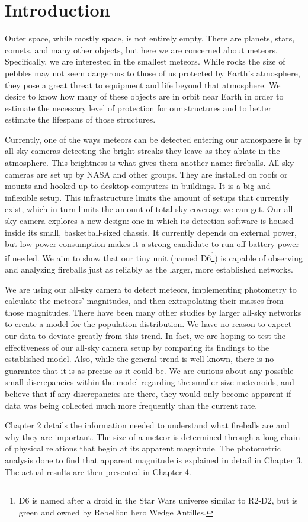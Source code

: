 \chapter{Introduction}

Outer space, while mostly space, is not entirely empty.  There are planets, stars, comets, and many other objects, but here we are concerned about meteors. Specifically, we are interested in the smallest meteors. While rocks the size of pebbles may not seem dangerous to those of us protected by Earth's atmosphere, they pose a great threat to equipment and life beyond that atmosphere. We desire to know how many of these objects are in orbit near Earth in order to estimate the necessary level of protection for our structures and to better estimate the lifespans of those structures.

Currently, one of the ways meteors can be detected entering our atmosphere is by all-sky cameras detecting the bright streaks they leave as they ablate in the atmosphere. This brightness is what gives them another name: fireballs. All-sky cameras are set up by NASA and other groups\cite{Jenniskens2011,Trigo-Rodriguez2007}. They are installed on roofs or mounts and hooked up to desktop computers in buildings. It is a big and inflexible setup. This infrastructure limits the amount of setups that currently exist, which in turn limits the amount of total sky coverage we can get. Our all-sky camera explores a new design: one in which its detection software is housed inside its small, basketball-sized chassis. It currently depends on external power, but low power consumption makes it a strong candidate to run off battery power if needed. We aim to show that our tiny unit (named D6\footnote{D6 is named after a droid in the Star Wars universe similar to R2-D2, but is green and owned by Rebellion hero Wedge Antilles.}) is capable of observing and analyzing fireballs just as reliably as the larger, more established networks.

We are using our all-sky camera to detect meteors, implementing photometry to calculate the meteors' magnitudes, and then extrapolating their masses from those magnitudes. There have been many other studies by larger all-sky networks to create a model for the population distribution. We have no reason to expect our data to deviate greatly from this trend. In fact, we are hoping to test the effectiveness of our all-sky camera setup by comparing its findings to the established model. Also, while the general trend is well known, there is no guarantee that it is as precise as it could be. We are curious about any possible small discrepancies within the model regarding the smaller size meteoroids, and believe that if any discrepancies are there, they would only become apparent if data was being collected much more frequently than the current rate.

Chapter 2 details the information needed to understand what fireballs are and why they are important. The size of a meteor is determined through a long chain of physical relations that begin at its apparent magnitude. The photometric analysis done to find that apparent magnitude is explained in detail in Chapter 3. The actual results are then presented in Chapter 4.

